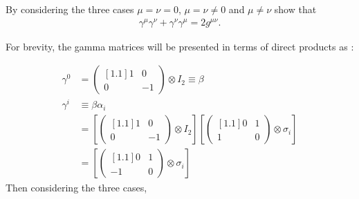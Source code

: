 \begin{problem}{4.6}
By considering the three cases $\mu=\nu=0$, $\mu=\nu\neq 0$ and $\mu \neq \nu$ show that 
\begin{align*}
    \gamma^\mu \gamma^\nu + \gamma^\nu \gamma^\mu = 2 g^{\mu\nu}.
\end{align*}
\end{problem}
\begin{solution}
For brevity, the gamma matrices will be presented in terms of direct products as :

\begin{align*}
    \gamma^0 &= \begin{pmatrix}[1.1]
        1 & 0 \\
        0 & -1 
    \end{pmatrix} \otimes I_2 \equiv \beta  \\[0.15in]
    \gamma^i &\equiv \beta \alpha_i \\[0.15in]
             &= \left[\begin{pmatrix}[1.1]
                1 & 0 \\
                0 & -1 
            \end{pmatrix} \otimes I_2 \right] \left[\begin{pmatrix}[1.1]
                0 & 1 \\
                1 & 0 
            \end{pmatrix} \otimes \sigma_i \right] \\[0.15in]
             &= \left[\begin{pmatrix}[1.1]
                0 & 1 \\
                -1 & 0 
            \end{pmatrix} \otimes \sigma_i \right]
\end{align*}
Then considering the three cases,


\end{solution}
